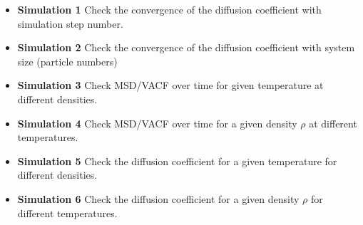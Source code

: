 \documentclass{article}
\begin{document}
\begin{itemize}
    \item {\bf Simulation 1}\newline
    Check the convergence of the diffusion coefficient
    with simulation step number.

    \item {\bf Simulation 2}\newline
    Check the convergence of the diffusion coefficient
    with system size (particle numbers)

    \item {\bf Simulation 3}\newline
    Check MSD/VACF over time for given temperature at different densities.

    \item {\bf Simulation 4}\newline
    Check MSD/VACF over time for a given density $\rho$ at different temperatures.

    \item {\bf Simulation 5}\newline
    Check the diffusion coefficient for a given temperature for different densities.

    \item {\bf Simulation 6}\newline
    Check the diffusion coefficient for a given density $\rho$ for different temperatures.

\end{itemize}



\end{document}
